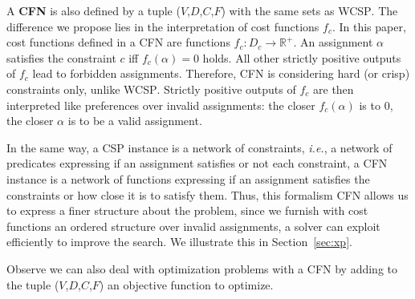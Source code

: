\documentclass{article}
\newcommand{\ie}{\textit{i.e.}}
\newcommand{\csp}{\textsc{CSP}\xspace}
\newcommand{\cfn}{\textsc{CFN}\xspace}
\newcommand{\wcsp}{\textsc{WCSP}\xspace}
\begin{document}
A \textbf{\cfn} is also defined by a tuple ($V$,$D$,$C$,$F$) with the same sets as \wcsp. The difference we propose lies in the interpretation of cost functions $f_c$. In this paper, cost functions defined in a \cfn are functions $f_c: D_c \rightarrow \mathbb{R}^+$. An assignment $\alpha$ satisfies the constraint $c$ iff $f_c(\alpha) = 0$ holds. All other strictly positive outputs of $f_c$ lead to forbidden assignments. Therefore, \cfn is considering hard (or crisp) constraints only, unlike \wcsp. Strictly positive outputs of $f_c$ are then interpreted like preferences over invalid assignments: the closer $f_c(\alpha)$ is to 0, the closer $\alpha$ is to be a valid assignment.

In the same way, a \csp instance is a network of constraints, \ie, a network of predicates expressing if an assignment satisfies or not each constraint, a \cfn instance is a network of functions expressing if an assignment satisfies the constraints or how close it is to satisfy them. Thus, this formalism \cfn allows us to express a finer structure about the problem, since we furnish with cost functions an ordered structure over invalid assignments, a solver can exploit efficiently to improve the search. We illustrate this in Section~\ref{sec:xp}.

Observe we can also deal with optimization problems with a \cfn by adding to the tuple ($V$,$D$,$C$,$F$) an objective function to optimize.



\end{document}
